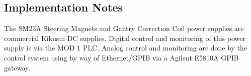 \documentclass[11pt]{book}		%
\begin{document}
\subsection{Implementation Notes}

The SM23A Steering Magnets and Gantry Correction Coil power supplies are commercial Kikusui DC supplies.  Digital control and monitoring of this power supply is via the MOD 1 PLC.  Analog control and monitoring are done by the control system using by way of Ethernet/GPIB via a Agilent E5810A GPIB gateway.
\end{document}

